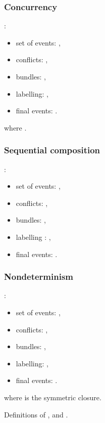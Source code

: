 \documentclass{llncs}
\newcommand{\<}{\langle}
\renewcommand{\>}{\rangle}
\begin{document}
\begin{figure}[!ht]
\hspace{-2.5mm}\begin{minipage}{.5\linewidth}
\subsubsection{Concurrency} :\\

\begin{itemize}
\item set of events: ,
\item conflicts: ,
\item bundles: ,
\item labelling: ,
\item final events: .
 \end{itemize} 
 where .
\end{minipage}\hspace{5mm}
\begin{minipage}{.5\linewidth}
\subsubsection{Sequential composition}  :\\

\begin{itemize}
\item set of events: ,
\item conflicts: ,
\item bundles: ,
\item labelling : ,
\item final events: .
\end{itemize}
\end{minipage}

\subsubsection{Nondeterminism}  :
\begin{itemize}
\item set of events: ,
\item conflicts: ,
\item bundles: ,
\item labelling: ,
\item final events: .
\end{itemize}
where  is the symmetric closure.
\caption{Definitions of ,  and .}\label{fig:operators}
\end{figure}
\end{document}
